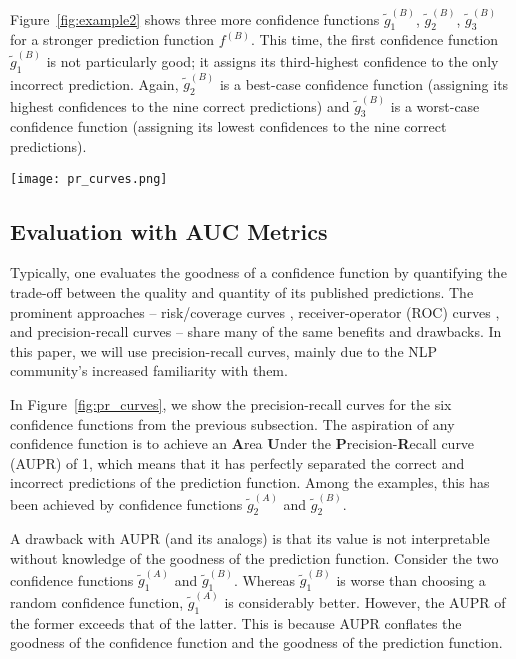 \documentclass[11pt]{article}
\begin{document}
Figure~\ref{fig:example2} shows three more confidence functions $\tilde{g}_1^{(B)}$, $\tilde{g}_2^{(B)}$, $\tilde{g}_3^{(B)}$ for a stronger prediction function $f^{(B)}$. This time, the first confidence function $\tilde{g}_1^{(B)}$ is not particularly good; it assigns its third-highest confidence to the only incorrect prediction. Again, $\tilde{g}_2^{(B)}$ is a best-case confidence function (assigning its highest confidences to the nine correct predictions) and $\tilde{g}_3^{(B)}$ is a worst-case confidence function (assigning its lowest confidences to the nine correct predictions). 

\begin{figure*}[t]
\centering
\texttt{[image: pr\_curves.png]}
\caption{Precision-recall curves for confidence functions $\tilde{g}_1^{(A)}$, $\tilde{g}_2^{(A)}$, $\tilde{g}_3^{(A)}$ (top, blue) and confidence functions $\tilde{g}_1^{(B)}$, $\tilde{g}_2^{(B)}$, $\tilde{g}_3^{(B)}$ (bottom, green).}
\label{fig:pr_curves}
\end{figure*}


\subsection{Evaluation with AUC Metrics}

Typically, one evaluates the goodness of a confidence function by quantifying the trade-off between the quality and quantity of its published predictions. The prominent approaches -- risk/coverage curves \cite{el2010foundations}, receiver-operator (ROC) curves \cite{Davis06}, and precision-recall curves \cite{HendrycksG17} -- share many of the same benefits and drawbacks. In this paper, we will use precision-recall curves, mainly due to the NLP community's increased familiarity with them.

In Figure~\ref{fig:pr_curves}, we show the precision-recall curves for the six confidence functions from the previous subsection. The aspiration of any confidence function is to achieve an \textbf{A}rea \textbf{U}nder the \textbf{P}recision-\textbf{R}ecall curve (AUPR) of 1, which means that it has perfectly separated the correct and incorrect predictions of the prediction function. Among the examples, this has been achieved by confidence functions $\tilde{g}_2^{(A)}$ and $\tilde{g}_2^{(B)}$.

A drawback with AUPR (and its analogs) is that its value is not interpretable without knowledge of the goodness of the prediction function. Consider the two confidence functions $\tilde{g}_1^{(A)}$ and $\tilde{g}_1^{(B)}$. Whereas $\tilde{g}_1^{(B)}$ is worse than choosing a random confidence function, $\tilde{g}_1^{(A)}$ is considerably better. However, the AUPR of the former exceeds that of the latter. This is because AUPR conflates the goodness of the confidence function and the goodness of the prediction function.
\end{document}
